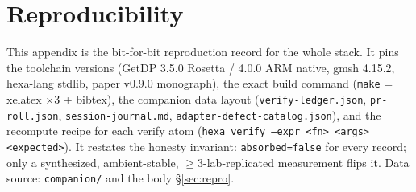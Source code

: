 \section{Reproducibility}
\label{app:repro}

This appendix is the bit-for-bit reproduction record for the whole
stack. It pins the toolchain versions (GetDP 3.5.0 Rosetta / 4.0.0 ARM
native, gmsh 4.15.2, hexa-lang stdlib, paper v0.9.0 monograph), the
exact build command (\texttt{make} = xelatex $\times 3$ + bibtex), the
companion data layout (\texttt{verify-ledger.json}, \texttt{pr-roll.json},
\texttt{session-journal.md}, \texttt{adapter-defect-catalog.json}), and
the recompute recipe for each verify atom (\texttt{hexa verify --expr
<fn> <args> <expected>}). It restates the honesty invariant:
\texttt{absorbed=false} for every record; only a synthesized,
ambient-stable, $\ge\!3$-lab-replicated measurement flips it.
Data source: \texttt{companion/} and the body \S\ref{sec:repro}.

